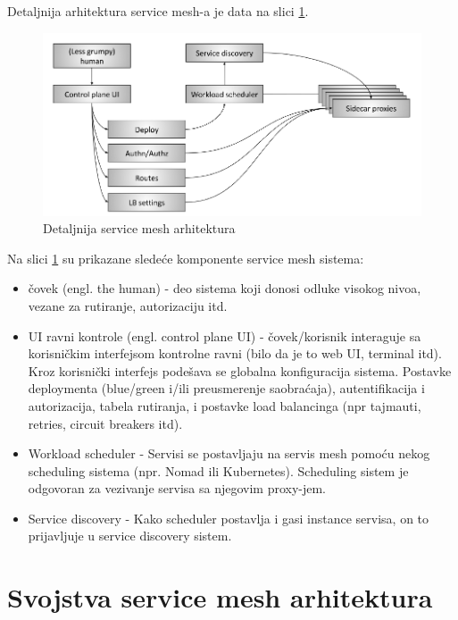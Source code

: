 \documentclass[a4paper,12pt]{report}
\begin{document}
Detaljnija arhitektura service mesh-a je data na slici \ref{fig:advanced-service-mesh-topology}.\newline

\begin{figure}[h]
    \centering
    \includegraphics[width=\textwidth]{advanced-service-mesh-architecture}
    \caption{Detaljnija service mesh arhitektura}
    \label{fig:advanced-service-mesh-topology}
\end{figure}

Na slici \ref{fig:advanced-service-mesh-topology} su prikazane sledeće komponente service mesh sistema: 

\begin{itemize}
	\item čovek (engl. the human) - deo sistema koji donosi odluke visokog nivoa, vezane za rutiranje, autorizaciju itd. 
	\item UI ravni kontrole (engl. control plane UI) - čovek/korisnik interaguje sa korisničkim interfejsom kontrolne ravni (bilo da je to web UI, terminal itd). Kroz korisnički interfejs podešava se globalna konfiguracija sistema. Postavke deploymenta (blue/green i/ili preusmerenje saobraćaja), autentifikacija i autorizacija, tabela rutiranja, i postavke load balancinga (npr tajmauti, retries, circuit breakers itd).
	\item Workload scheduler - Servisi se postavljaju na servis mesh pomoću nekog scheduling sistema (npr. Nomad ili Kubernetes). Scheduling sistem je odgovoran za vezivanje servisa sa njegovim proxy-jem.
	\item Service discovery - Kako scheduler postavlja i gasi instance servisa, on to prijavljuje u service discovery sistem. 
\end{itemize}


\chapter{Svojstva service mesh arhitektura}
\end{document}

